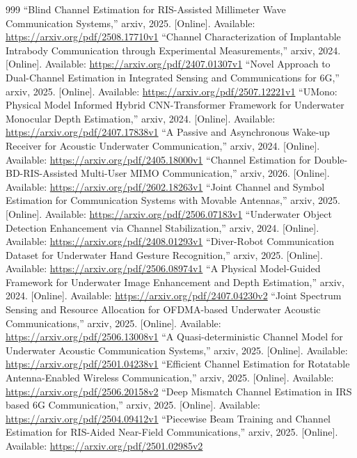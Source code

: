 \documentclass[10pt,journal]{IEEEtran}
\begin{document}
\begin{thebibliography}{999}
 ``Blind Channel Estimation for RIS-Assisted Millimeter Wave Communication Systems,'' arxiv, 2025. [Online]. Available: \url{https://arxiv.org/pdf/2508.17710v1}
 ``Channel Characterization of Implantable Intrabody Communication through Experimental Measurements,'' arxiv, 2024. [Online]. Available: \url{https://arxiv.org/pdf/2407.01307v1}
 ``Novel Approach to Dual-Channel Estimation in Integrated Sensing and Communications for 6G,'' arxiv, 2025. [Online]. Available: \url{https://arxiv.org/pdf/2507.12221v1}
 ``UMono: Physical Model Informed Hybrid CNN-Transformer Framework for Underwater Monocular Depth Estimation,'' arxiv, 2024. [Online]. Available: \url{https://arxiv.org/pdf/2407.17838v1}
 ``A Passive and Asynchronous Wake-up Receiver for Acoustic Underwater Communication,'' arxiv, 2024. [Online]. Available: \url{https://arxiv.org/pdf/2405.18000v1}
 ``Channel Estimation for Double-BD-RIS-Assisted Multi-User MIMO Communication,'' arxiv, 2026. [Online]. Available: \url{https://arxiv.org/pdf/2602.18263v1}
 ``Joint Channel and Symbol Estimation for Communication Systems with Movable Antennas,'' arxiv, 2025. [Online]. Available: \url{https://arxiv.org/pdf/2506.07183v1}
 ``Underwater Object Detection Enhancement via Channel Stabilization,'' arxiv, 2024. [Online]. Available: \url{https://arxiv.org/pdf/2408.01293v1}
 ``Diver-Robot Communication Dataset for Underwater Hand Gesture Recognition,'' arxiv, 2025. [Online]. Available: \url{https://arxiv.org/pdf/2506.08974v1}
 ``A Physical Model-Guided Framework for Underwater Image Enhancement and Depth Estimation,'' arxiv, 2024. [Online]. Available: \url{https://arxiv.org/pdf/2407.04230v2}
 ``Joint Spectrum Sensing and Resource Allocation for OFDMA-based Underwater Acoustic Communications,'' arxiv, 2025. [Online]. Available: \url{https://arxiv.org/pdf/2506.13008v1}
 ``A Quasi-deterministic Channel Model for Underwater Acoustic Communication Systems,'' arxiv, 2025. [Online]. Available: \url{https://arxiv.org/pdf/2501.04238v1}
 ``Efficient Channel Estimation for Rotatable Antenna-Enabled Wireless Communication,'' arxiv, 2025. [Online]. Available: \url{https://arxiv.org/pdf/2506.20158v2}
 ``Deep Mismatch Channel Estimation in IRS based 6G Communication,'' arxiv, 2025. [Online]. Available: \url{https://arxiv.org/pdf/2504.09412v1}
 ``Piecewise Beam Training and Channel Estimation for RIS-Aided Near-Field Communications,'' arxiv, 2025. [Online]. Available: \url{https://arxiv.org/pdf/2501.02985v2}

\end{thebibliography}
\end{document}
